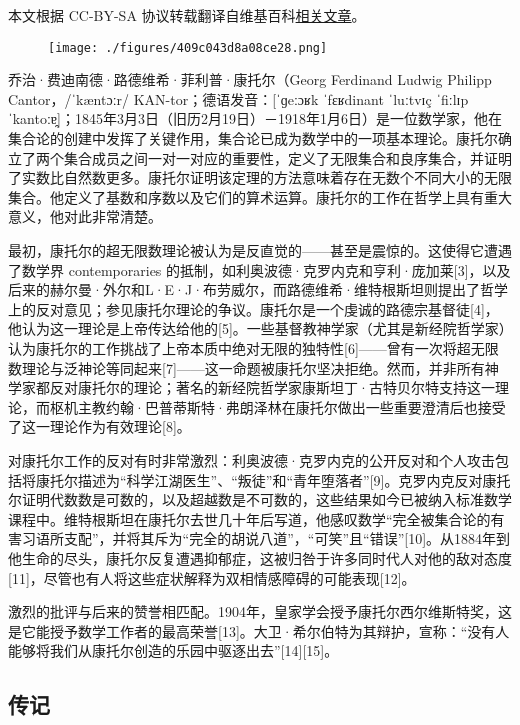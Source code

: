 
本文根据 CC-BY-SA 协议转载翻译自维基百科\href{https://en.wikipedia.org/wiki/Georg_Cantor}{相关文章}。

\begin{figure}[ht]
\centering
\texttt{[image: ./figures/409c043d8a08ce28.png]}
\caption{} \label{fig_Canto_1}
\end{figure}
乔治·费迪南德·路德维希·菲利普·康托尔（Georg Ferdinand Ludwig Philipp Cantor，/ˈkæntɔːr/ KAN-tor；德语发音：[ˈɡeːɔʁk ˈfɛʁdinant ˈluːtvɪç ˈfiːlɪp ˈkantoːɐ̯]；1845年3月3日（旧历2月19日）－1918年1月6日）是一位数学家，他在集合论的创建中发挥了关键作用，集合论已成为数学中的一项基本理论。康托尔确立了两个集合成员之间一对一对应的重要性，定义了无限集合和良序集合，并证明了实数比自然数更多。康托尔证明该定理的方法意味着存在无数个不同大小的无限集合。他定义了基数和序数以及它们的算术运算。康托尔的工作在哲学上具有重大意义，他对此非常清楚。

最初，康托尔的超无限数理论被认为是反直觉的——甚至是震惊的。这使得它遭遇了数学界 contemporaries 的抵制，如利奥波德·克罗内克和亨利·庞加莱[3]，以及后来的赫尔曼·外尔和L·E·J·布劳威尔，而路德维希·维特根斯坦则提出了哲学上的反对意见；参见康托尔理论的争议。康托尔是一个虔诚的路德宗基督徒[4]，他认为这一理论是上帝传达给他的[5]。一些基督教神学家（尤其是新经院哲学家）认为康托尔的工作挑战了上帝本质中绝对无限的独特性[6]——曾有一次将超无限数理论与泛神论等同起来[7]——这一命题被康托尔坚决拒绝。然而，并非所有神学家都反对康托尔的理论；著名的新经院哲学家康斯坦丁·古特贝尔特支持这一理论，而枢机主教约翰·巴普蒂斯特·弗朗泽林在康托尔做出一些重要澄清后也接受了这一理论作为有效理论[8]。

对康托尔工作的反对有时非常激烈：利奥波德·克罗内克的公开反对和个人攻击包括将康托尔描述为“科学江湖医生”、“叛徒”和“青年堕落者”[9]。克罗内克反对康托尔证明代数数是可数的，以及超越数是不可数的，这些结果如今已被纳入标准数学课程中。维特根斯坦在康托尔去世几十年后写道，他感叹数学“完全被集合论的有害习语所支配”，并将其斥为“完全的胡说八道”，“可笑”且“错误”[10]。从1884年到他生命的尽头，康托尔反复遭遇抑郁症，这被归咎于许多同时代人对他的敌对态度[11]，尽管也有人将这些症状解释为双相情感障碍的可能表现[12]。

激烈的批评与后来的赞誉相匹配。1904年，皇家学会授予康托尔西尔维斯特奖，这是它能授予数学工作者的最高荣誉[13]。大卫·希尔伯特为其辩护，宣称：“没有人能够将我们从康托尔创造的乐园中驱逐出去”[14][15]。
\subsection{传记}  
